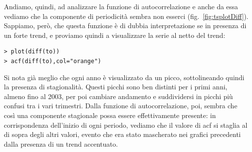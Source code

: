 \documentclass[11pt,a4paper,oneside]{article}
\begin{document}
Andiamo, quindi, ad analizzare la funzione di autocorrelazione e anche da essa vediamo che la componente di periodicità sembra non esserci (fig.~\ref{fig:tsplotDiff}). Sappiamo, però, che questa funzione è di dubbia interpretazione se in presenza di un forte trend, e proviamo quindi a visualizzare la serie al netto del trend: 
\begin{verbatim}
> plot(diff(to))
> acf(diff(to),col="orange")
\end{verbatim}
Si nota già meglio che ogni anno è visualizzato da un picco, sottolineando quindi la presenza di stagionalità. Questi picchi sono ben distinti per i primi anni, almeno fino al 2003, per poi cambiare andamento e suddividersi in picchi più confusi tra i vari trimestri. Dalla funzione di autocorrelazione, poi, sembra che così una componente stagionale possa essere effettivamente presente: in corrispondenza dell'inizio di ogni periodo, vediamo che il valore di acf si staglia al di sopra degli altri valori, evento che era stato mascherato nei grafici precedenti dalla presenza di un trend accentuato.
\begin{figure}[h]
\centering
{}
 \\
\caption{}
\label{fig:graficiDiff}
\end{figure}
\end{document}
